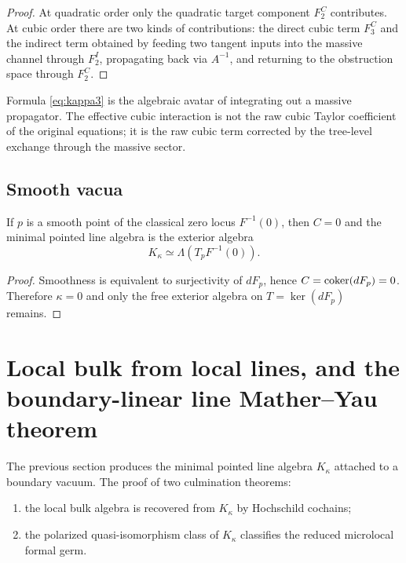 \begin{proof}
At quadratic order only the quadratic target component $F_2^C$ contributes. At cubic order there are two kinds of contributions: the direct cubic term $F_3^C$ and the indirect term obtained by feeding two tangent inputs into the massive channel through $F_2^I$, propagating back via $A^{-1}$, and returning to the obstruction space through $F_2^C$.
\end{proof}

\begin{remark}
Formula \eqref{eq:kappa3} is the algebraic avatar of integrating out a massive propagator. The effective cubic interaction is not the raw cubic Taylor coefficient of the original equations; it is the raw cubic term corrected by the tree-level exchange through the massive sector.
\end{remark}

\subsection{Smooth vacua}

\begin{corollary}%
If $p$ is a smooth point of the classical zero locus $F^{-1}(0)$, then $C=0$ and the minimal pointed line algebra is the exterior algebra
\[
K_\kappa\simeq \Lambda(T_pF^{-1}(0)).
\]
\end{corollary}

\begin{proof}
Smoothness is equivalent to surjectivity of $dF_p$, hence $C=\operatorname{coker}(dF_p)=0$. Therefore $\kappa=0$ and only the free exterior algebra on $T=\ker(dF_p)$ remains.
\end{proof}


\section{Local bulk from local lines, and the boundary-linear line Mather--Yau theorem}%

The previous section produces the minimal pointed line algebra $K_\kappa$ attached to a boundary vacuum. The proof of two culmination theorems:
\begin{enumerate}[label=(\arabic*),leftmargin=1.8em]
\item the local bulk algebra is recovered from $K_\kappa$ by Hochschild cochains;
\item the polarized quasi-isomorphism class of $K_\kappa$ classifies the reduced microlocal formal germ.
\end{enumerate}


